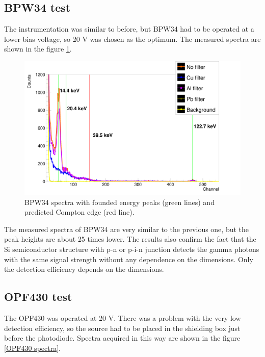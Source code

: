 \subsection{BPW34 test}
The instrumentation was similar to before, but BPW34 had to be operated at a lower bias voltage, so 20 V was chosen as the optimum. The measured spectra are shown in the figure \ref{BPW34 spectra}.

\begin{figure}[H]
 \centering
 \includegraphics[scale=0.125, angle = 0]{./pictures/BPW34GammaTest.png}
  \caption{BPW34 spectra with founded energy peaks (green lines) and predicted Compton edge (red line).}
 \label{BPW34 spectra}
 
\end{figure}
The measured spectra of BPW34 are very similar to the previous one, but the peak heights are about 25 times lower. The results also confirm the fact that the Si semiconductor structure with p-n or p-i-n junction detects the gamma photons with the same signal strength without any dependence on the dimensions. Only the detection efficiency depends on the dimensions.
\subsection{OPF430 test}
The OPF430 was operated at 20 V. There was a problem with the very low detection efficiency, so the source had to be placed in the shielding box just before the photodiode. Spectra acquired in this way are shown in the figure \ref{OPF430 spectra}.

